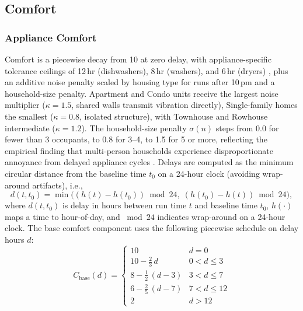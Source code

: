 \documentclass[final,3p,times]{elsarticle}
\begin{document}
\subsection{Comfort}

\subsubsection{Appliance Comfort}

Comfort is a piecewise decay from 10 at zero delay, with appliance-specific tolerance ceilings of 12\,hr (dishwashers), 8\,hr (washers), and 6\,hr (dryers) \cite{paetz2012,waseem2020}, plus an additive noise penalty scaled by housing type for runs after 10\,pm \cite{epa1974noise} and a household-size penalty. Apartment and Condo units receive the largest noise multiplier ($\kappa=1.5$, shared walls transmit vibration directly), Single-family homes the smallest ($\kappa=0.8$, isolated structure), with Townhouse and Rowhouse intermediate ($\kappa=1.2$). The household-size penalty $\sigma(n)$ steps from 0.0 for fewer than 3 occupants, to 0.8 for 3--4, to 1.5 for 5 or more, reflecting the empirical finding that multi-person households experience disproportionate annoyance from delayed appliance cycles \cite{waseem2020}.
Delays are computed as the minimum circular distance from the baseline time $t_0$ on a 24-hour clock (avoiding wrap-around artifacts), i.e.,
\begin{equation}
  d(t,t_0)=\min\!\bigl((h(t)-h(t_0))\bmod 24,\; (h(t_0)-h(t))\bmod 24\bigr),
  \label{eq:appliance_delay_circular}
\end{equation}
\noindent where $d(t,t_0)$ is delay in hours between run time $t$ and baseline time $t_0$, $h(\cdot)$ maps a time to hour-of-day, and $\bmod 24$ indicates wrap-around on a 24-hour clock.
The base comfort component uses the following piecewise schedule on delay hours $d$:
\begin{equation}
  C_{\mathrm{base}}(d)=
  \begin{cases}
    10                                  & d=0 \\[3pt]
    10-\frac{2}{3}\,d                   & 0<d\le 3 \\[3pt]
    8-\frac{1}{2}\,(d-3)                & 3<d\le 7 \\[3pt]
    6-\frac{2}{5}\,(d-7)                & 7<d\le 12 \\[3pt]
    2                                   & d>12
  \end{cases}
  \label{eq:appliance_base_comfort}
\end{equation}
\end{document}
